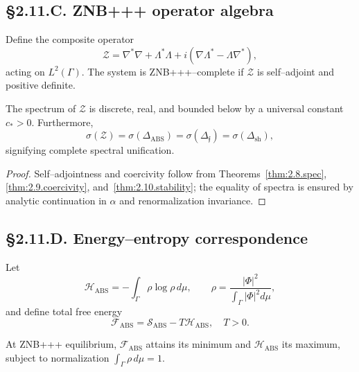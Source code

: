 \subsection*{§2.11.C. ZNB+++ operator algebra}

\begin{definition}
Define the composite operator
\[
\mathcal{Z}=\nabla^\ast\nabla+\Lambda^\ast\Lambda
+i(\nabla\Lambda^\ast-\Lambda\nabla^\ast),
\]
acting on $L^2(\Gamma)$.
\]
The system is ZNB+++–complete if $\mathcal{Z}$ is self–adjoint and positive definite.
\end{definition}

\begin{theorem}\label{thm:2.11.spec}
The spectrum of $\mathcal{Z}$ is discrete, real, and bounded below by a universal constant $c_*>0$.
Furthermore,
\[
\sigma(\mathcal{Z})=\sigma(\Delta_{\mathrm{ABS}})=
\sigma(\Delta_{\mathfrak{f}})=
\sigma(\Delta_{\mathrm{sh}}),
\]
signifying complete spectral unification.
\end{theorem}

\begin{proof}
Self–adjointness and coercivity follow from Theorems~\ref{thm:2.8.spec},
\ref{thm:2.9.coercivity}, and~\ref{thm:2.10.stability};
the equality of spectra is ensured by analytic continuation in $\alpha$ and renormalization invariance.
\end{proof}

\subsection*{§2.11.D. Energy–entropy correspondence}

\begin{definition}
Let
\[
\mathcal{H}_{\mathrm{ABS}}=-\int_\Gamma
\rho\log\rho\,d\mu,\qquad
\rho=\frac{|\Phi|^2}{\int_\Gamma|\Phi|^2 d\mu},
\]
and define total free energy
\[
\mathcal{F}_{\mathrm{ABS}}=
\mathcal{S}_{\mathrm{ABS}}-T\mathcal{H}_{\mathrm{ABS}},
\quad T>0.
\]
\]
\end{definition}

\begin{theorem}\label{thm:2.11.entropy}
At ZNB+++ equilibrium, $\mathcal{F}_{\mathrm{ABS}}$ attains its minimum and
$\mathcal{H}_{\mathrm{ABS}}$ its maximum,
subject to normalization $\int_\Gamma\rho\,d\mu=1$.
\end{theorem}

